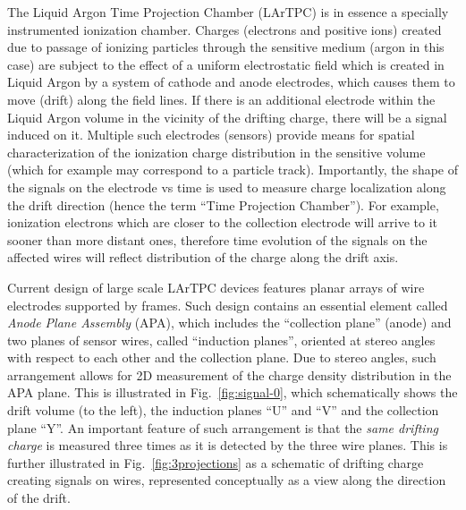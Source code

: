 The Liquid Argon Time Projection Chamber (LArTPC) is in essence a specially instrumented ionization chamber. Charges (electrons and positive ions)
created due to passage of ionizing particles through the sensitive medium (argon in this case) are subject to the effect of a uniform electrostatic
field which is created in Liquid Argon by a system of cathode and anode electrodes, which causes them to move (drift) along the field lines.
If there is an additional electrode within the Liquid Argon volume in the vicinity of the drifting charge, there will be a signal induced on it. Multiple such
electrodes (sensors) provide means for spatial characterization of the ionization charge distribution in the sensitive volume (which for example may
correspond to a particle track). Importantly, the shape of the signals on the electrode vs time is used to measure charge localization along the drift
direction (hence the term ``Time Projection Chamber''). For example, ionization electrons which are closer to the collection electrode will arrive to it sooner than
more distant ones, therefore time evolution of the signals on the affected wires will reflect distribution of the charge along the drift axis.

Current design of large scale LArTPC devices features planar arrays of wire electrodes supported by frames.
Such design contains an essential element called \textit{Anode Plane Assembly} (APA), which includes the ``collection plane'' (anode)
and two planes of sensor wires, called ``induction planes'', oriented at stereo angles with respect to each other and the collection plane.
Due to stereo angles, such arrangement allows for 2D measurement of the charge density distribution in the APA plane.
This is illustrated in Fig.~\ref{fig:signal-0}, which schematically shows the drift volume (to the left), the induction planes ``U'' and ``V'' and
the collection plane ``Y''. An important feature of such arrangement is that the \textit{same drifting charge} is measured three times as it
is detected by the three wire planes. This is further illustrated in Fig.~\ref{fig:3projections} as a schematic of drifting charge creating signals on wires,
represented conceptually as a view along the direction of the drift.

